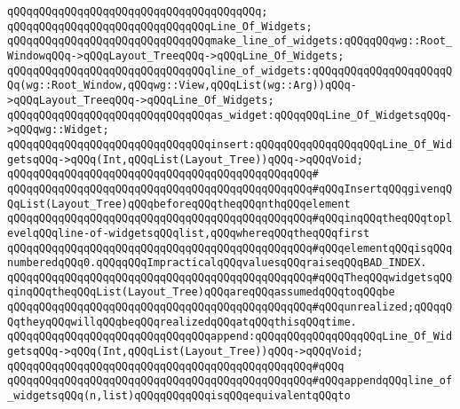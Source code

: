 \verb|qQQqqQQqqQQqqQQqqQQqqQQqqQQqqQQqqQQqqQQq;|\newline
\newline
\verb|qQQqqQQqqQQqqQQqqQQqqQQqqQQqqQQqLine_Of_Widgets;|\newline
\newline
\verb|qQQqqQQqqQQqqQQqqQQqqQQqqQQqqQQqmake_line_of_widgets:qQQqqQQqwg::Root_WindowqQQq->qQQqLayout_TreeqQQq->qQQqLine_Of_Widgets;|\newline
\verb|qQQqqQQqqQQqqQQqqQQqqQQqqQQqqQQqline_of_widgets:qQQqqQQqqQQqqQQqqQQqqQQq(wg::Root_Window,qQQqwg::View,qQQqList(wg::Arg))qQQq->qQQqLayout_TreeqQQq->qQQqLine_Of_Widgets;|\newline
\newline
\verb|qQQqqQQqqQQqqQQqqQQqqQQqqQQqqQQqas_widget:qQQqqQQqLine_Of_WidgetsqQQq->qQQqwg::Widget;|\newline
\newline
\verb|qQQqqQQqqQQqqQQqqQQqqQQqqQQqqQQqinsert:qQQqqQQqqQQqqQQqqQQqLine_Of_WidgetsqQQq->qQQq(Int,qQQqList(Layout_Tree))qQQq->qQQqVoid;|\newline
\verb|qQQqqQQqqQQqqQQqqQQqqQQqqQQqqQQqqQQqqQQqqQQqqQQq#|\newline
\verb|qQQqqQQqqQQqqQQqqQQqqQQqqQQqqQQqqQQqqQQqqQQqqQQq#qQQqInsertqQQqgivenqQQqList(Layout_Tree)qQQqbeforeqQQqtheqQQqnthqQQqelement|\newline
\verb|qQQqqQQqqQQqqQQqqQQqqQQqqQQqqQQqqQQqqQQqqQQqqQQq#qQQqinqQQqtheqQQqtoplevelqQQqline-of-widgetsqQQqlist,qQQqwhereqQQqtheqQQqfirst|\newline
\verb|qQQqqQQqqQQqqQQqqQQqqQQqqQQqqQQqqQQqqQQqqQQqqQQq#qQQqelementqQQqisqQQqnumberedqQQq0.qQQqqQQqImpracticalqQQqvaluesqQQqraiseqQQqBAD_INDEX.|\newline
\verb|qQQqqQQqqQQqqQQqqQQqqQQqqQQqqQQqqQQqqQQqqQQqqQQq#qQQqTheqQQqwidgetsqQQqinqQQqtheqQQqList(Layout_Tree)qQQqareqQQqassumedqQQqtoqQQqbe|\newline
\verb|qQQqqQQqqQQqqQQqqQQqqQQqqQQqqQQqqQQqqQQqqQQqqQQq#qQQqunrealized;qQQqqQQqtheyqQQqwillqQQqbeqQQqrealizedqQQqatqQQqthisqQQqtime.|\newline
\newline
\verb|qQQqqQQqqQQqqQQqqQQqqQQqqQQqqQQqappend:qQQqqQQqqQQqqQQqqQQqLine_Of_WidgetsqQQq->qQQq(Int,qQQqList(Layout_Tree))qQQq->qQQqVoid;|\newline
\verb|qQQqqQQqqQQqqQQqqQQqqQQqqQQqqQQqqQQqqQQqqQQqqQQq#qQQq|\newline
\verb|qQQqqQQqqQQqqQQqqQQqqQQqqQQqqQQqqQQqqQQqqQQqqQQq#qQQqappendqQQqline_of_widgetsqQQq(n,list)qQQqqQQqqQQqisqQQqequivalentqQQqto|\newline
